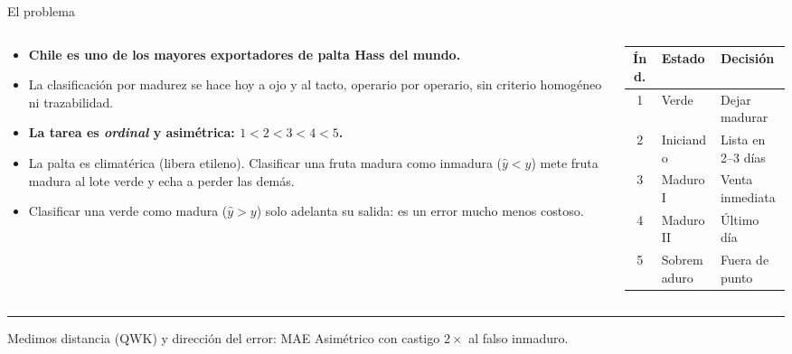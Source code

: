 \documentclass[aspectratio=169,11pt,table]{beamer}
\newcommand{\cierre}[1]{%
  \vfill
  {\color{verdecla}\rule{2.5pt}{0.9em}}\hspace{0.4em}%
  {\footnotesize\color{grisSuave}#1}%
}
\begin{document}
\begin{frame}{El problema}
\begin{columns}[T]
\begin{column}{0.58\textwidth}
{\scriptsize
\setlength{\itemsep}{0.28em}
\begin{itemize}
  \item {\bfseries Chile es uno de los mayores exportadores de palta Hass del mundo.}
  \item La clasificación por madurez se hace hoy a ojo y al tacto, operario por operario, sin criterio homogéneo ni trazabilidad.
  \item {\bfseries La tarea es \emph{ordinal} y asimétrica: $1<2<3<4<5$.}
  \item La palta es climatérica (libera etileno). Clasificar una fruta madura como inmadura ($\hat{y} < y$) mete fruta madura al lote verde y echa a perder las demás.
  \item Clasificar una verde como madura ($\hat{y} > y$) solo adelanta su salida: es un error mucho menos costoso.
\end{itemize}
}
\end{column}
\begin{column}{0.38\textwidth}
{\tiny
\centering
\begin{tabular}{cll}
\toprule
\rowcolor{verdeosc}\color{white}\bfseries Índ. & \color{white}\bfseries Estado & \color{white}\bfseries Decisión \\
\midrule
1 & Verde & Dejar madurar \\
2 & Iniciando & Lista en 2--3 días \\
3 & Maduro I & Venta inmediata \\
4 & Maduro II & Último día \\
5 & Sobremaduro & Fuera de punto \\
\bottomrule
\end{tabular}
}
\end{column}
\end{columns}
\cierre{Medimos distancia (QWK) y dirección del error: MAE Asimétrico con castigo $2\times$ al falso inmaduro.}
\end{frame}
\end{document}
